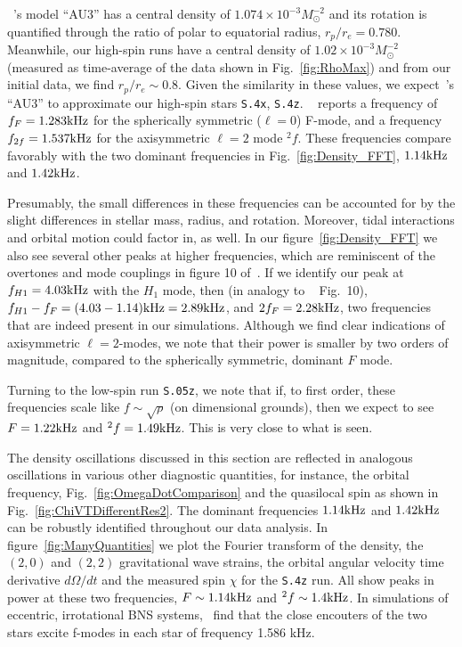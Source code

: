 ~\cite{Dimmelmeier:2005zk}'s model ``AU3'' has a central density of
$1.074 \times 10^{-3} M_{\odot}^{-2}$ and its rotation is
quantified through the ratio of polar to equatorial radius,
$r_p/r_e = 0.780$.
Meanwhile, our high-spin runs have a central density of
$1.02 \times 10^{-3} M_{\odot}^{-2}$ (measured as time-average of the data shown in
Fig.~\ref{fig:RhoMax}) and from our initial data, we find
$r_p/r_e \sim 0.8$. Given the similarity in these
values, we expect~\cite{Dimmelmeier:2005zk}'s ``AU3'' to approximate our high-spin
stars {\tt S.4x}, {\tt S.4z}.
~\cite{Dimmelmeier:2005zk} reports a frequency of
$f_F=1.283\rm{kHz}$ for the spherically symmetric ($\ell=0$) F-mode,
and a frequency $f_{2f}=1.537\rm{kHz}$ for the axisymmetric $\ell=2$
mode $^2f$. These frequencies compare favorably with the two dominant
frequencies in Fig.~\ref{fig:Density_FFT}, $1.14\rm{kHz}$ and
$1.42\rm{kHz}$.

Presumably, the small differences in these frequencies can be
accounted for by the slight differences in stellar mass, radius, and
rotation. Moreover, tidal interactions and orbital motion could
factor in, as well. In our figure~\ref{fig:Density_FFT} we also see
several other peaks at higher frequencies, which are reminiscent of
the overtones and mode couplings in figure 10 of~\cite{Dimmelmeier:2005zk}. If we identify our peak at
  $f_{H1}=4.03\rm{kHz}$ with the $H_1$ mode, then (in analogy to
  ~\cite{Dimmelmeier:2005zk} Fig.~10), 
  $f_{H1}-f_{F}=(4.03-1.14)\rm{kHz}=2.89\rm{kHz}$, and
  $2f_{F}=2.28\rm{kHz}$, two frequencies that are indeed present in
  our simulations.
Although we find clear indications of axisymmetric $\ell=2$-modes,
we note that their power is smaller by two orders of magnitude,
compared to the spherically symmetric, dominant $F$ mode. 

Turning to the low-spin run {\tt S.05z}, we note that if, to first order,
these frequencies scale like $f\sim\sqrt{\rho}$ (on dimensional
grounds), then we expect to see $F=1.22\rm{kHz}$ and
$^2f=1.49\rm{kHz}$. This is very close to what is seen.


The density oscillations discussed in this section are reflected in
analogous oscillations in various other diagnostic quantities, for
instance, the orbital frequency, Fig.~\ref{fig:OmegaDotComparison} and
the quasilocal spin as shown in Fig.~\ref{fig:ChiVTDifferentRes2}.
The dominant frequencies $1.14\rm{kHz}$ and $1.42\rm{kHz}$ can be
robustly identified throughout our data analysis. In
figure~\ref{fig:ManyQuantities} we plot the Fourier transform of the
density, the $(2,0)$ and $(2,2)$ gravitational wave strains, the
orbital angular velocity time derivative $d\Omega/dt$ and the
measured spin $\chi$ for the {\tt S.4z} run. All show peaks in power at
these two frequencies, $F\sim1.14\rm{kHz}$ and $^2f\sim1.4\rm{kHz}$.
In simulations of eccentric, irrotational BNS systems,~\cite{Gold:2011df} find that the close encouters of the two stars excite f-modes in each star of frequency 1.586 kHz.

